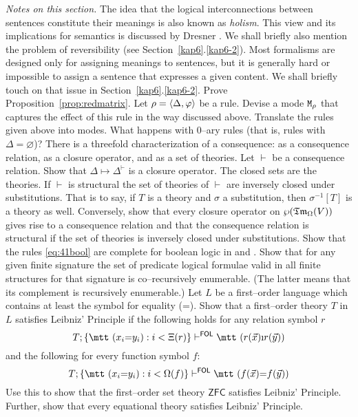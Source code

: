 {\it Notes on this section.}
The idea that the logical interconnections between sentences 
constitute their meanings is also known as {\it holism}.
This view and its implications for semantics is discussed 
by Dresner . 
We shall briefly also mention the problem of reversibility
(see Section~\ref{kap6}.\ref{kap6-2}).
Most formalisms are designed only for assigning meanings 
to sentences, but it is generally hard or impossible to assign 
a sentence that expresses a given content. We shall briefly touch 
on that issue in  Section~\ref{kap6}.\ref{kap6-2}. 
\vplatz
\exercise
Prove Proposition~\ref{prop:redmatrix}.
\vplatz
\exercise
Let $\rho = \langle \Delta, \varphi\rangle$ be a rule. Devise a mode
$\mbox{\tt M}_{\rho}$ that captures the effect of this rule
in the way discussed above. Translate the rules given above
into modes. What happens with 0--ary rules (that is, rules
with $\Delta = \varnothing$)?
\vplatz \exercise There is a threefold characterization of a
consequence: as a consequence relation, as a closure operator, and
as a set of theories. Let $\vdash$ be a consequence relation. Show
that $\Delta \mapsto \Delta^{\vdash}$ is a closure operator. The
closed sets are the theories. If $\vdash$ is structural the set of
theories of $\vdash$ are inversely closed under substitutions. That
is to say, if $T$ is a theory and $\sigma$ a substitution, then
$\sigma^{-1}[T]$ is a theory as well. Conversely, show that every
closure operator on $\wp(\mathfrak{Tm}_{\Omega}(V))$ gives rise to a
consequence relation and that the consequence relation is
structural if the set of theories is inversely closed under
substitutions.
\vplatz
\exercise
Show that the rules \eqref{eq:41bool} are complete for boolean logic 
in {\mtt{}} and {\mtt{}}.
\vplatz
\exercise
Show that for any given finite signature the set of predicate
logical formulae valid in all finite structures for that signature
is co--recursively enumerable. (The latter means that its
complement is recursively enumerable.)
\vplatz
\exercise
Let $L$ be a first--order language which contains at least the
symbol for equality ({\mtt =}). Show that a first--order theory 
$T$ in $L$ satisfies Leibniz' Principle if the following holds 
for any relation symbol $r$
\begin{equation}
T; \{\mbox{\mtt ($x_i$=$y_i$)} : i < \Xi(r)\} \vdash^{\mathsf{FOL}}
    \mbox{\mtt ($r$($\vec{x}$)\symbol{25}$r$($\vec{y}$))}
\end{equation}
and the following for every function symbol $f$:
\begin{equation}
T; \{\mbox{\mtt ($x_i$=$y_i$)} : i < \Omega(f)\} \vdash^{\mathsf{FOL}}
    \mbox{\mtt ($f$($\vec{x}$)=$f$($\vec{y}$))}
\end{equation}
Use this to show that the first--order set theory $\mathsf{ZFC}$ 
satisfies Leibniz' Principle. Further, show that every equational theory
satisfies Leibniz' Principle.
